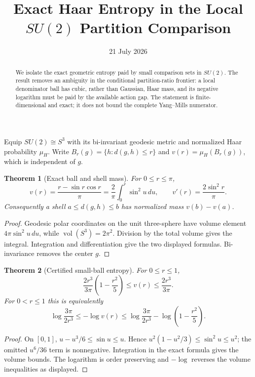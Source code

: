 \documentclass[11pt]{article}
\title{Exact Haar Entropy in the Local $SU(2)$ Partition Comparison}
\author{}
\date{21 July 2026}
\newtheorem{theorem}{Theorem}
\begin{document}
\maketitle

\begin{abstract}
We isolate the exact geometric entropy paid by small comparison sets in
$SU(2)$.  The result removes an ambiguity in the conditional partition-ratio
frontier: a local denominator ball has cubic, rather than Gaussian, Haar mass,
and its negative logarithm must be paid by the available action gap.  The
statement is finite-dimensional and exact; it does not bound the complete
Yang--Mills numerator.
\end{abstract}

Equip $SU(2)\cong S^3$ with its bi-invariant geodesic metric and normalized
Haar probability $\mu_H$.  Write $B_r(g)=\{h:d(g,h)\le r\}$ and
$v(r)=\mu_H(B_r(g))$, which is independent of $g$.

\begin{theorem}[Exact ball and shell mass]
For $0\le r\le\pi$,
\[
 v(r)=\frac{r-\sin r\cos r}{\pi}
     =\frac{2}{\pi}\int_0^r\sin^2u\,du,
 \qquad
 v'(r)=\frac{2\sin^2r}{\pi}.
\]
Consequently a shell $a\le d(g,h)\le b$ has normalized mass $v(b)-v(a)$.
\end{theorem}

\begin{proof}
Geodesic polar coordinates on the unit three-sphere have volume element
$4\pi\sin^2u\,du$, while $\operatorname{vol}(S^3)=2\pi^2$.  Division by the
total volume gives the integral.  Integration and differentiation give the
two displayed formulas.  Bi-invariance removes the center $g$.
\end{proof}

\begin{theorem}[Certified small-ball entropy]
For $0\le r\le1$,
\[
 \frac{2r^3}{3\pi}\left(1-\frac{r^2}{5}\right)
 \le v(r)\le \frac{2r^3}{3\pi}.
\]
For $0<r\le1$ this is equivalently
\[
 \log\frac{3\pi}{2r^3}
 \le -\log v(r)
 \le \log\frac{3\pi}{2r^3}
       -\log\left(1-\frac{r^2}{5}\right).
\]
\end{theorem}

\begin{proof}
On $[0,1]$, $u-u^3/6\le\sin u\le u$.  Hence
$u^2(1-u^2/3)\le\sin^2u\le u^2$; the omitted $u^6/36$ term is nonnegative.
Integration in the exact formula gives the volume bounds.  The logarithm is
order preserving and $-\log$ reverses the volume inequalities as displayed.
\end{proof}
\end{document}
